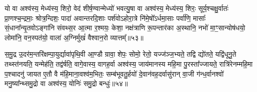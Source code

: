 यो वा अश्व॑स्य॒ मेध्य॑स्य॒ शिरो॒ वेद॑ शीर्\mbox{}ष॒ण्वान्मेध्यो॑ भवत्यु॒षा वा अश्व॑स्य॒ मेध्य॑स्य॒ शिरः॒ सूर्य॒श्चक्षु॒र्वातः॑ प्रा॒णश्च॒न्द्रमाः॒ श्रोत्र॒न्दिशः॒ पादा॑ अवान्तरदि॒शाः पर्\mbox{}श॑वो\-ऽहोरा॒त्रे नि॑मे॒षो᳚\-ऽर्धमा॒साः पर्वा॑णि॒ मासाः᳚ सं॒धाना᳚न्यृ॒तवो\-ऽङ्गा॑नि संवथ्स॒र आ॒त्मा र॒श्मयः॒ केशा॒ नक्ष॑त्राणि रू॒पन्तार॑का अ॒स्थानि॒ नभो॑ मा॒ꣳ॒सान्योष॑धयो॒ लोमा॑नि॒ वन॒स्पत॑यो॒ वाला॑ अ॒ग्निर्मुखं॑ वैश्वान॒रो व्यात्तम्᳚॥५३॥

स॒मु॒द्र उ॒दर॑म॒न्तरि॑क्षम्पा॒युर्द्यावा॑पृथि॒वी आ॒ण्डौ ग्रावा॒ शेपः॒ सोमो॒ रेतो॒ यज्ज॑ञ्ज॒भ्यते॒ तद्वि द्यो॑तते॒ यद्वि॑धूनु॒ते तथ्स्त॑नयति॒ यन्मेह॑ति॒ तद्व॑र्\mbox{}षति॒ वागे॒वास्य॒ वागह॒र्वा अश्व॑स्य॒ जाय॑मानस्य महि॒मा पु॒रस्ता᳚ज्जायते॒ रात्रि॑रेनम्महि॒मा प॒श्चादनु॑ जायत ए॒तौ वै म॑हि॒माना॒वश्व॑म॒भितः॒ सम्ब॑भूवतु॒र्\mbox{}हयो॑ दे॒वान॑वह॒दर्वासु॑रान् वा॒जी ग॑न्ध॒र्वानश्वो॑ मनु॒ष्या᳚न्थ्समु॒द्रो वा अश्व॑स्य॒ योनिः॑ समु॒द्रो बन्धुः॑॥५४॥

{\anuvakamend[{व्यात्त॑मवह॒द्द्वाद॑श च॥25॥}]}
